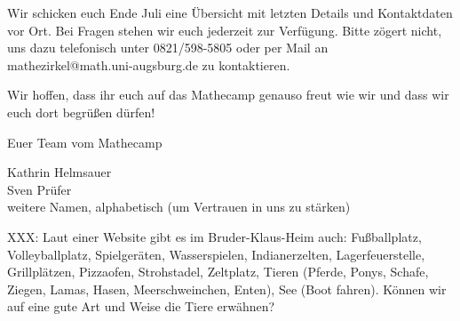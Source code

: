 \documentclass{zettel}
\begin{document}
Wir schicken euch Ende Juli eine Übersicht mit
letzten Details und Kontaktdaten vor Ort. Bei Fragen stehen wir euch jederzeit
zur Verfügung. Bitte zögert nicht, uns dazu telefonisch unter 0821/598-5805 oder per
Mail an \textsf{mathezirkel@math.uni-augsburg.de} zu kontaktieren.

Wir hoffen, dass ihr euch auf das Mathecamp genauso freut wie wir und dass wir
euch dort begrüßen dürfen!

\vspace{2em}

Euer Team vom Mathecamp

Kathrin Helmsauer \\
Sven Prüfer \\
weitere Namen, alphabetisch (um Vertrauen in uns zu stärken)

\vfill

XXX: Laut einer Website gibt es im Bruder-Klaus-Heim auch:
Fußballplatz, Volleyballplatz, Spielgeräten, Wasserspielen, Indianerzelten,
Lagerfeuerstelle, Grillplätzen, Pizzaofen, Strohstadel, Zeltplatz, Tieren
(Pferde, Ponys, Schafe, Ziegen, Lamas, Hasen, Meerschweinchen, Enten), See
(Boot fahren). Können wir auf eine gute Art und Weise die Tiere erwähnen?

\end{document}

